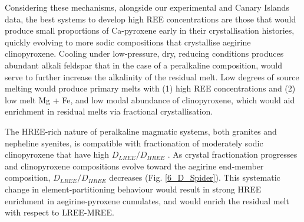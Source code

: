 \documentclass[review,authoryear,12pt]{elsarticle}
\begin{document}
Considering these mechanisms, alongside our experimental and Canary Islands data, the best systems to develop high REE concentrations are those that would produce small proportions of Ca-pyroxene early in their crystallisation histories, quickly evolving to more sodic compositions that crystallise aegirine clinopyroxene. Cooling under low-pressure, dry, reducing conditions produces abundant alkali feldspar that in the case of a peralkaline composition, would serve to further increase the alkalinity of the residual melt.
	Low degrees of source melting would produce primary melts with (1) high REE concentrations and (2) low melt Mg + Fe, and low modal abundance of clinopyroxene, which would aid enrichment in residual melts via fractional crystallisation.



The HREE-rich nature of peralkaline magmatic systems, both granites and nepheline syenites, is compatible with fractionation of moderately sodic clinopyroxene that have high $D_{LREE}/D_{HREE}$ \citep[e.g.][]{Moller2016, Dostal2017}. As crystal fractionation progresses and clinopyroxene compositions evolve toward the aegirine end-member composition, $D_{LREE}/D_{HREE}$ decreases (Fig. \ref{6_D_Spider}). This systematic change in element-partitioning behaviour would result in strong HREE enrichment in aegirine-pyroxene cumulates, and would enrich the residual melt with respect to LREE-MREE.

\end{document}
